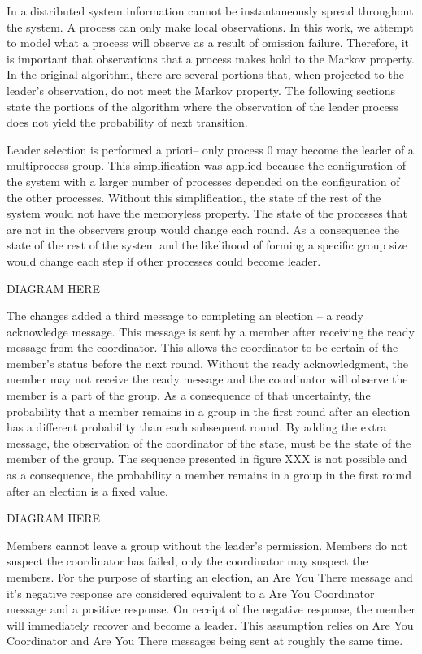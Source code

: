 In a distributed system information cannot be instantaneously spread throughout the system.
A process can only make local observations.
In this work, we attempt to model what a process will observe as a result of omission failure.
Therefore, it is important that observations that a process makes hold to the Markov property.
In the original algorithm, there are several portions that, when projected to the leader's observation, do not meet the Markov property.
The following sections state the portions of the algorithm where the observation of the leader process does not yield the probability of next transition.

Leader selection is performed a priori-- only process 0 may become the leader of a multiprocess group.
This simplification was applied because the configuration of the system with a larger number of processes depended on the configuration of the other processes.
Without this simplification, the state of the rest of the system would not have the memoryless property.
The state of the processes that are not in the observers group would change each round.
As a consequence the state of the rest of the system and the likelihood of forming a specific group size would change each step if other processes could become leader.

DIAGRAM HERE

The changes added a third message to completing an election -- a ready acknowledge message.
This message is sent by a member after receiving the ready message from the coordinator.
This allows the coordinator to be certain of the member's status before the next round.
Without the ready acknowledgment, the member may not receive the ready message and the coordinator will observe the member is a part of the group.
As a consequence of that uncertainty, the probability that a member remains in a group in the first round after an election has a different probability than each subsequent round.
By adding the extra message, the observation of the coordinator of the state, must be the state of the member of the group.
The sequence presented in figure XXX is not possible and as a consequence, the probability a member remains in a group in the first round after an election is a fixed value.

DIAGRAM HERE

Members cannot leave a group without the leader's permission.
Members do not suspect the coordinator has failed, only the coordinator may suspect the members.
For the purpose of starting an election, an Are You There message and it's negative response are considered equivalent to a Are You Coordinator message and a positive response.
On receipt of the negative response, the member will immediately recover and become a leader.
This assumption relies on Are You Coordinator and Are You There messages being sent at roughly the same time.

